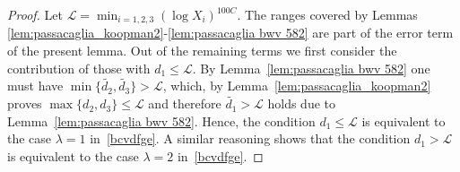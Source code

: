 \documentclass[a4paper,12pt,reqno]{amsart}
\numberwithin{equation}{section} \numberwithin{figure}{section}
\renewcommand{\c}{\mathcal}
\renewcommand{\leq}{\leqslant}
\renewcommand{\#}{\sharp}
\theoremstyle{definition}
\numberwithin{lemma}{section}
\begin{document}
\begin{proof}  Let $\c L=\min_{i=1,2,3} (\log  X_i)^{100 C}$.
The ranges covered by Lemmas    \ref{lem:passacaglia_koopman2}-\ref{lem:passacaglia bwv 582} are part of the error term of the present lemma. 
Out of the remaining terms we first consider the contribution of those with $d_1 \leq \c L$.
By
Lemma~\ref{lem:passacaglia bwv 582} one must have $\min\{ \widetilde{d_2 } , \widetilde{d_3 } \}>\c L$,
which, by Lemma~\ref{lem:passacaglia_koopman2} proves    $ \max\{d_2,d_3\}\leq \c L$ and therefore $ \widetilde{d_1 }   >\c L$ holds 
due to Lemma~\ref{lem:passacaglia bwv 582}. Hence, the condition $d_1\leq \c L $  is equivalent to the case $\lambda=1$ 
in~\eqref{bcvdfge}. A similar reasoning shows that the  condition  $d_1> \c L$  is equivalent to the case 
$\lambda=2$ in~\eqref{bcvdfge}. \end{proof}
\end{document}
